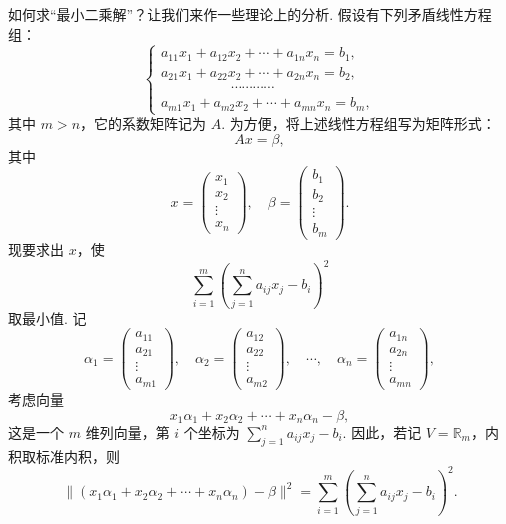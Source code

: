 \documentclass[UTF8, 12pt, fontset=fandol, oneside]{ctexart}
\begin{document}
如何求“最小二乘解”？让我们来作一些理论上的分析. 假设有下列矛盾线性方程组：
\[
  \begin{cases}
    a_{11}x_1+a_{12}x_2+\cdots+a_{1n}x_n=b_1,\\
    a_{21}x_1+a_{22}x_2+\cdots+a_{2n}x_n=b_2,\\
    \hspace{5em}\cdots\cdots\cdots\cdots\\
    a_{m1}x_1+a_{m2}x_2+\cdots+a_{mn}x_n=b_m,
  \end{cases}
\]
其中 $m>n$，它的系数矩阵记为 $A$. 为方便，将上述线性方程组写为矩阵形式：
\begin{equation}
  Ax=\beta,
  \tag{9.10.4}
\end{equation}
其中
\[
  x=
  \left(\begin{array}{c}
    x_1\\ x_2\\ \vdots\\ x_n
  \end{array}\right),\quad
  \beta=
  \left(\begin{array}{c}
    b_1\\ b_2\\ \vdots\\ b_m
  \end{array}\right).
\]
现要求出 $x$，使
\[
  \sum_{i=1}^m\left(\sum_{j=1}^na_{ij}x_j-b_i\right)^2
\]
取最小值. 记
\[
  \alpha_1=
  \left(\begin{array}{c}
    a_{11}\\ a_{21}\\ \vdots\\ a_{m1}
  \end{array}\right),\quad
  \alpha_2=
  \left(\begin{array}{c}
    a_{12}\\ a_{22}\\ \vdots\\ a_{m2}
  \end{array}\right),\quad
  \cdots,\quad
  \alpha_n=
  \left(\begin{array}{c}
    a_{1n}\\ a_{2n}\\ \vdots\\ a_{mn}
  \end{array}\right),
\]
考虑向量
\[
  x_1\alpha_1+x_2\alpha_2+\cdots+x_n\alpha_n-\beta,
\]
这是一个 $m$ 维列向量，第 $i$ 个坐标为 $\sum_{j=1}^na_{ij}x_j-b_i$. 因此，若记 $V=\mathbb R_m$，内积取标准内积，则
\[
  \|(x_1\alpha_1+x_2\alpha_2+\cdots+x_n\alpha_n)-\beta\|^2
  =\sum_{i=1}^m\left(\sum_{j=1}^na_{ij}x_j-b_i\right)^2.
\]
\end{document}
